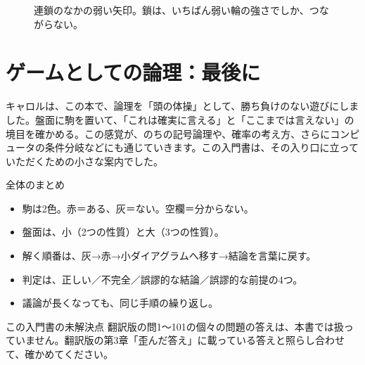 \documentclass[a4paper,11pt,openany]{ltjsbook}
\begin{document}
\begin{figure}[htbp]
\centering
{}
\caption{連鎖のなかの弱い矢印。鎖は、いちばん弱い輪の強さでしか、つながらない。}
\end{figure}

\section{ゲームとしての論理：最後に}

キャロルは、この本で、論理を「頭の体操」として、勝ち負けのない遊びにしました。盤面に駒を置いて、「これは確実に言える」と「ここまでは言えない」の境目を確かめる。この感覚が、のちの記号論理や、確率の考え方、さらにコンピュータの条件分岐などにも通じていきます。この入門書は、その入り口に立っていただくための小さな案内でした。

\begin{pointbox}{全体のまとめ}
\begin{itemize}[leftmargin=1.5em]
\item 駒は2色。赤＝ある、灰＝ない。空欄＝分からない。
\item 盤面は、小（2つの性質）と大（3つの性質）。
\item 解く順番は、灰→赤→小ダイアグラムへ移す→結論を言葉に戻す。
\item 判定は、正しい／不完全／誤謬的な結論／誤謬的な前提の4つ。
\item 議論が長くなっても、同じ手順の繰り返し。
\end{itemize}
\end{pointbox}

\begin{notebox}{この入門書の未解決点}
翻訳版の問1〜101の個々の問題の答えは、本書では扱っていません。翻訳版の第3章「歪んだ答え」に載っている答えと照らし合わせて、確かめてください。
\end{notebox}
\end{document}

